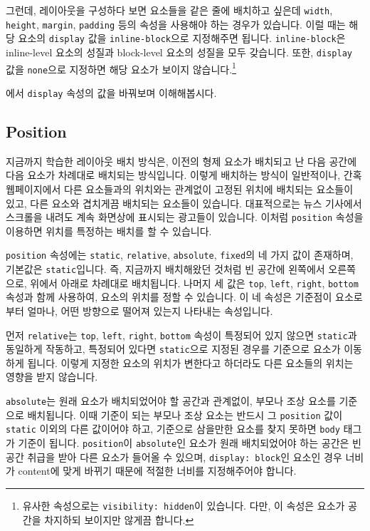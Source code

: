 그런데, 레이아웃을 구성하다 보면 요소들을 같은 줄에 배치하고 싶은데 \texttt{width}, \texttt{height}, \texttt{margin}, \texttt{padding} 등의 속성을 사용해야 하는 경우가 있습니다. 이럴 때는 해당 요소의 \texttt{display} 값을 \texttt{inline-block}으로 지정해주면 됩니다. \texttt{inline-block}은 inline-level 요소의 성질과 block-level 요소의 성질을 모두 갖습니다. 또한, \texttt{display} 값을 \texttt{none}으로 지정하면 해당 요소가 보이지 않습니다.\footnote{유사한 속성으로는 \texttt{visibility: hidden}이 있습니다. 다만, 이 속성은 요소가 공간을 차지하되 보이지만 않게끔 합니다.}
 
에서 \texttt{display} 속성의 값을 바꿔보며 이해해봅시다. 

\subsection*{Position}
지금까지 학습한 레이아웃 배치 방식은, 이전의 형제 요소가 배치되고 난 다음 공간에 다음 요소가 차례대로 배치되는 방식입니다. 이렇게 배치하는 방식이 일반적이나, 간혹 웹페이지에서 다른 요소들과의 위치와는 관계없이 고정된 위치에 배치되는 요소들이 있고, 다른 요소와 겹치게끔 배치되는 요소들이 있습니다. 대표적으로는 뉴스 기사에서 스크롤을 내려도 계속 화면상에 표시되는 광고들이 있습니다. 이처럼 \texttt{position} 속성을 이용하면 위치를 특정하는 배치를 할 수 있습니다. 

\texttt{position} 속성에는 \texttt{static}, \texttt{relative}, \texttt{absolute}, \texttt{fixed}의 네 가지 값이 존재하며, 기본값은 \texttt{static}입니다. 즉, 지금까지 배치해왔던 것처럼 빈 공간에 왼쪽에서 오른쪽으로, 위에서 아래로 차례대로 배치됩니다. 나머지 세 값은 \texttt{top}, \texttt{left}, \texttt{right}, \texttt{bottom} 속성과 함께 사용하여, 요소의 위치를 정할 수 있습니다. 이 네 속성은 기준점이 요소로부터 얼마나, 어떤 방향으로 떨어져 있는지 나타내는 속성입니다.

먼저 \texttt{relative}는 \texttt{top}, \texttt{left}, \texttt{right}, \texttt{bottom} 속성이 특정되어 있지 않으면 \texttt{static}과 동일하게 작동하고, 특정되어 있다면 \texttt{static}으로 지정된 경우를 기준으로 요소가 이동하게 됩니다. 이렇게 지정한 요소의 위치가 변한다고 하더라도 다른 요소들의 위치는 영향을 받지 않습니다. 

\texttt{absolute}는 원래 요소가 배치되었어야 할 공간과 관계없이, 부모나 조상 요소를 기준으로 배치됩니다. 이때 기준이 되는 부모나 조상 요소는 반드시 그 \texttt{position} 값이 \texttt{static} 이외의 다른 값이어야 하고, 기준으로 삼을만한 요소를 찾지 못하면 \texttt{body} 태그가 기준이 됩니다. \texttt{position}이 \texttt{absolute}인 요소가 원래 배치되었어야 하는 공간은 빈 공간 취급을 받아 다른 요소가 들어올 수 있으며, \texttt{display: block}인 요소인 경우 너비가 content에 맞게 바뀌기 때문에 적절한 너비를 지정해주어야 합니다. 

